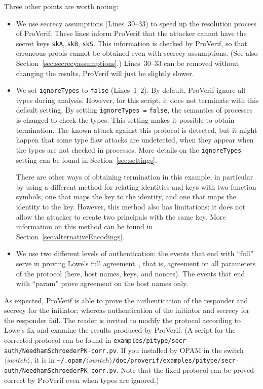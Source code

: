 \documentclass{book}
\newcommand{\nonterm}[1]{\langle\mathit{#1}\rangle}
\newcommand{\switchdir}{\nonterm{switch}}
\newcommand{\opamsubdir}[1]{\nolinkurl{~/.opam/}$\switchdir$\nolinkurl{/#1}}
\begin{document}
Three other points are worth noting:
\begin{itemize}

\item We use secrecy assumptions (Lines~30--33) to speed up the
  resolution process of ProVerif. These lines inform ProVerif that the
  attacker cannot have the secret keys \lstinline!skA!,
  \lstinline!skB!, \lstinline!skS!. This information is checked by
  ProVerif, so that erroneous proofs cannot be obtained even with
  secrecy assumptions.  (See also
  Section~\ref{sec:secrecyassumptions}.) Lines~30--33 can be removed
  without changing the results, ProVerif will just be slightly slower.

\item We set \lstinline!ignoreTypes! to \lstinline!false!
  (Lines~1--2).  By default, ProVerif ignore all types during
  analysis. However, for this script, it does not terminate with this
  default setting. By setting \lstinline!ignoreTypes =!
  \lstinline!false!, the semantics of processes is changed to check
  the types.  This setting makes it possible to obtain termination. The
  known attack against this protocol is detected, but it might happen
  that some type flaw attacks are undetected, when they appear when
  the types are not checked in processes. More details on the
  \lstinline!ignoreTypes! setting can be found in Section~\ref{sec:settings}.

There are other ways of obtaining termination in this example,
in particular by using a different method for relating identities
and keys with two function symbols, one that maps the key to the
identity, and one that maps the identity to the key.
However, this method also has limitations: it does not allow the
attacker to create two principals with the same key.
More information on this method can be found in
Section~\ref{sec:alternativeEncodings}.

\item We use two different levels of authentication: the events that
  end with ``full'' serve in proving Lowe's full agreement~\cite{Lowe97},
  that is, agreement on all parameters of the protocol (here, host
  names, keys, and nonces). The events that end with ``param'' prove
  agreement on the host names only.

\end{itemize}

As expected, ProVerif is able to prove the authentication of the responder and secrecy for the initiator; whereas authentication of the initiator and secrecy for the responder fail. The reader is invited to modify the protocol according to Lowe's fix and examine the results produced by ProVerif. (A script for the corrected protocol can be found in \texttt{examples/pitype/secr-auth/NeedhamSchroederPK-corr.pv}.  If you installed by OPAM in the switch $\switchdir$, it is in \opamsubdir{doc/proverif/examples/pitype/secr-auth/NeedhamSchroederPK-corr.pv}. Note that the fixed protocol can be proved correct by ProVerif even when types are ignored.)
\end{document}
